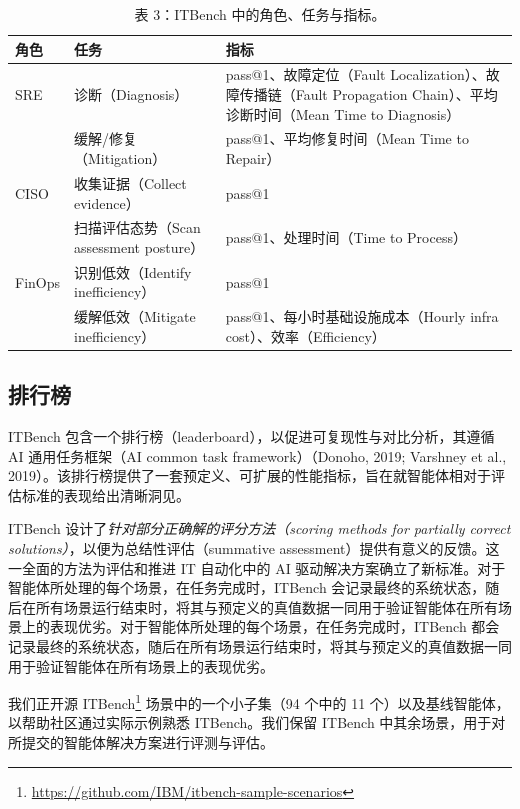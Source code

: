 \begin{table}[H]
\centering
\caption{表 3：ITBench 中的角色、任务与指标。}
\label{tab:personas-tasks}
\begin{tabular}{lll}
\toprule
\textbf{角色} & \textbf{任务} & \textbf{指标} \\
\midrule
SRE & 诊断（Diagnosis） & pass@1、故障定位（Fault Localization）、故障传播链（Fault Propagation Chain）、平均诊断时间（Mean Time to Diagnosis） \\
    & 缓解/修复（Mitigation） & pass@1、平均修复时间（Mean Time to Repair） \\
\midrule
CISO & 收集证据（Collect evidence） & pass@1 \\
     & 扫描评估态势（Scan assessment posture） & pass@1、处理时间（Time to Process） \\
\midrule
FinOps & 识别低效（Identify inefficiency） & pass@1 \\
       & 缓解低效（Mitigate inefficiency） & pass@1、每小时基础设施成本（Hourly infra cost）、效率（Efficiency） \\
\bottomrule
\end{tabular}
\end{table}

\subsection{排行榜}

ITBench 包含一个排行榜（leaderboard），以促进可复现性与对比分析，其遵循 AI 通用任务框架（AI common task framework）（Donoho, 2019; Varshney et al., 2019）。该排行榜提供了一套预定义、可扩展的性能指标，旨在就智能体相对于评估标准的表现给出清晰洞见。

ITBench 设计了\emph{针对部分正确解的评分方法（scoring methods for partially correct solutions）}，以便为总结性评估（summative assessment）提供有意义的反馈。这一全面的方法为评估和推进 IT 自动化中的 AI 驱动解决方案确立了新标准。对于智能体所处理的每个场景，在任务完成时，ITBench 会记录最终的系统状态，随后在所有场景运行结束时，将其与预定义的真值数据一同用于验证智能体在所有场景上的表现优劣。对于智能体所处理的每个场景，在任务完成时，ITBench 都会记录最终的系统状态，随后在所有场景运行结束时，将其与预定义的真值数据一同用于验证智能体在所有场景上的表现优劣。

我们正开源 ITBench\footnote{\url{https://github.com/IBM/itbench-sample-scenarios}} 场景中的一个小子集（94 个中的 11 个）以及基线智能体，以帮助社区通过实际示例熟悉 ITBench。我们保留 ITBench 中其余场景，用于对所提交的智能体解决方案进行评测与评估。
